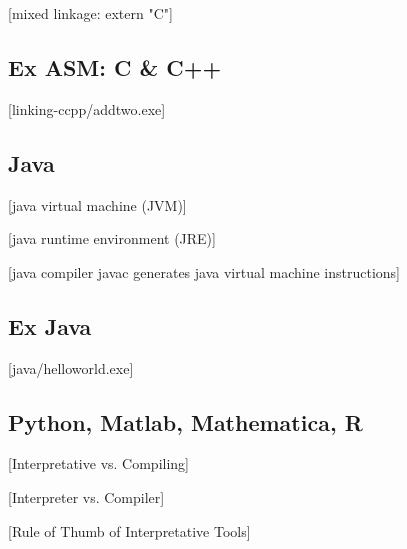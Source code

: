 \documentclass[main]{subfiles}
\begin{document}
[mixed linkage: extern "C"]
\subsection{Ex ASM: C \& C++}
[linking-ccpp/addtwo.exe]

\subsection{Java}
[java virtual machine (JVM)]

[java runtime environment (JRE)]

[java compiler javac generates java virtual machine instructions]

\subsection{Ex Java}
[java/helloworld.exe]

\subsection{Python, Matlab, Mathematica, R}
[Interpretative vs. Compiling]

[Interpreter vs. Compiler]

[Rule of Thumb of Interpretative Tools]
\end{document}
